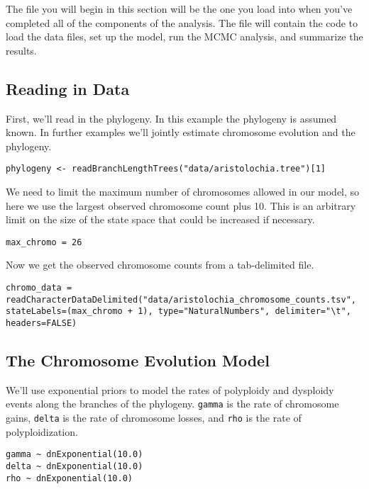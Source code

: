 The file you will begin in this section will be the one you load into \RevBayes when you've completed all of the components of the analysis. The file will contain the \Rev code to load the data files, set up the model, run the MCMC analysis, and summarize the results.

\medskip
\subsection{Reading in Data}\label{subsub:Exercise-LoadData}

First, we'll read in the phylogeny. In this example the phylogeny is assumed known. In further
examples we'll jointly estimate chromosome evolution and the phylogeny.
{\tt \begin{snugshade*}
\begin{lstlisting}
phylogeny <- readBranchLengthTrees("data/aristolochia.tree")[1]
\end{lstlisting}
\end{snugshade*}}

We need to limit the maximum number of chromosomes allowed in our model,
so here we use the largest observed chromosome count plus 10. This is an arbitrary limit
on the size of the state space that could be increased if necessary.
{\tt \begin{snugshade*}
\begin{lstlisting}
max_chromo = 26 
\end{lstlisting}
\end{snugshade*}}

Now we get the observed chromosome counts from a tab-delimited file.
{\tt \begin{snugshade*}
\begin{lstlisting}
chromo_data = readCharacterDataDelimited("data/aristolochia_chromosome_counts.tsv", stateLabels=(max_chromo + 1), type="NaturalNumbers", delimiter="\t", headers=FALSE)
\end{lstlisting}
\end{snugshade*}}


\bigskip
\subsection{The Chromosome Evolution Model}


We'll use exponential priors to model the rates of polyploidy and 
dysploidy events along the branches of the phylogeny.
\texttt{gamma} is the rate of chromosome gains,
\texttt{delta} is the rate of chromosome losses, and
\texttt{rho} is the rate of polyploidization.
{\tt \begin{snugshade*}
\begin{lstlisting}
gamma ~ dnExponential(10.0)
delta ~ dnExponential(10.0)
rho ~ dnExponential(10.0)
\end{lstlisting}
\end{snugshade*}}


